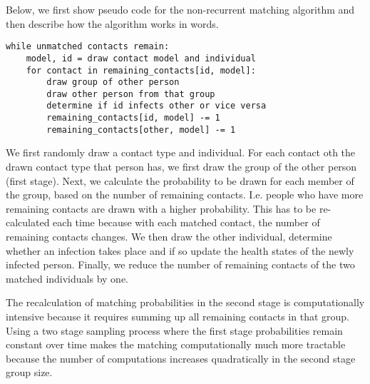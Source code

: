 Below, we first show pseudo code for the non-recurrent matching algorithm and then describe how the algorithm works in words.


\begin{lstlisting}
while unmatched contacts remain:
    model, id = draw contact model and individual
    for contact in remaining_contacts[id, model]:
        draw group of other person
        draw other person from that group
        determine if id infects other or vice versa
        remaining_contacts[id, model] -= 1
        remaining_contacts[other, model] -= 1
\end{lstlisting}


We first randomly draw a contact type and individual. For each contact oth the drawn contact type that person has, we first draw the group of the other person (first stage). Next, we calculate the probability to be drawn for each member of the group, based on the number of remaining contacts. I.e. people who have more remaining contacts are drawn with a higher probability. This has to be re-calculated each time because with each matched contact, the number of remaining contacts changes. We then draw the other individual, determine whether an infection takes place and if so update the health states of the newly infected person. Finally, we reduce the number of remaining contacts of the two matched individuals by one.

The recalculation of matching probabilities in the second stage is computationally intensive because it requires summing up all remaining contacts in that group. Using a two stage sampling process where the first stage probabilities remain constant over time makes the matching computationally much more tractable because the number of computations increases quadratically in the second stage group size.
